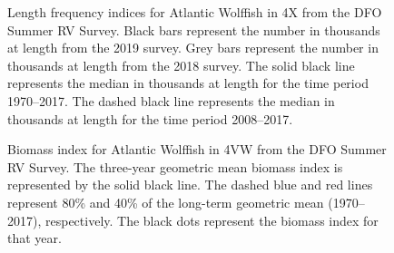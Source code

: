 \documentclass[11pt]{book}
\begin{document}
\begin{figure}[htb]

{\centering {} 

}

\caption{Length frequency indices for Atlantic Wolffish in 4X from the DFO Summer RV Survey. Black bars represent the number in thousands at length from the 2019 survey. Grey bars represent the number in thousands at length from the 2018 survey. The solid black line represents the median in thousands at length for the time period 1970--2017. The dashed black line represents the median in thousands at length for the time period 2008--2017.}\label{fig:67-fig-awolffish-lengthfreq4X}
\end{figure}

\begin{figure}[htb]

{\centering {} 

}

\caption{Biomass index for Atlantic Wolffish in 4VW from the DFO Summer RV Survey. The three-year geometric mean biomass index is represented by the solid black line. The dashed blue and red lines represent 80\% and 40\% of the long-term geometric mean (1970--2017), respectively. The black dots represent the biomass index for that year.}\label{fig:68-fig-awolffish-biomass4VW}
\end{figure}
\end{document}

